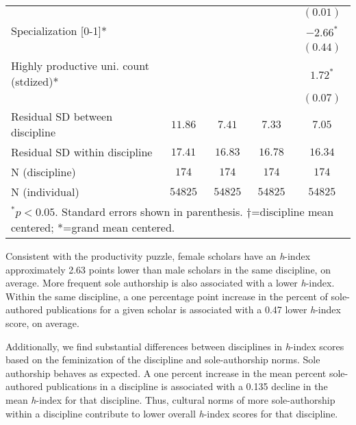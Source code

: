 \documentclass[
  10pt,
  letterpaper,
]{article}
\providecommand{\DIFaddendFL}{} %
\DeclareRobustCommand{\DIFaddendFL}{\DIFOaddendFL \let\includegraphics\DIFOincludegraphics} %
\begin{document}
\begin{table}
{\begin{tabular}{l c c c c}
                                        &             &              &              & $(0.01)$     \\
Specialization [0-1]*                   &             &              &              & $-2.66^{*}$  \\
                                        &             &              &              & $(0.44)$     \\
Highly productive uni. count (stdized)* &             &              &              & $1.72^{*}$   \\
                                        &             &              &              & $(0.07)$     \\
\hline
Residual SD between discipline          & $11.86$     & $7.41$       & $7.33$       & $7.05$       \\
Residual SD within discipline           & $17.41$     & $16.83$      & $16.78$      & $16.34$      \\
N (discipline)                          & $174$       & $174$        & $174$        & $174$        \\
N (individual)                          & $54825$     & $54825$      & $54825$      & $54825$      \\
\hline
\multicolumn{5}{l}{\scriptsize{$^{*}p<0.05$. Standard errors shown in parenthesis. $\dagger$=discipline mean centered; *=grand mean centered.}}
\end{tabular}

}
\DIFaddendFL 

\end{table}%

Consistent with the productivity puzzle, female scholars have an
\emph{h}-index approximately 2.63 points lower than male scholars in the
same discipline, on average. More frequent sole authorship is also
associated with a lower \emph{h}-index. Within the same discipline, a
one percentage point increase in the percent of sole-authored
publications for a given scholar is associated with a 0.47 lower
\emph{h}-index score, on average.

Additionally, we find substantial differences between disciplines in
\emph{h}-index scores based on the feminization of the discipline and
sole-authorship norms. Sole authorship behaves as expected. A one
percent increase in the mean percent sole-authored publications in a
discipline is associated with a 0.135 decline in the mean \emph{h}-index
for that discipline. Thus, cultural norms of more sole-authorship within
a discipline contribute to lower overall \emph{h}-index scores for that
discipline.
\end{document}
